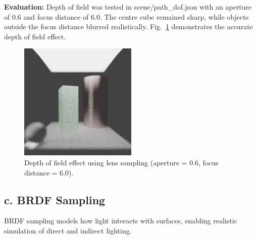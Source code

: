\documentclass[11pt,a4paper]{article}
\begin{document}
\noindent\textbf{Evaluation:}
Depth of field was tested in scene/path\_dof.json with an aperture of 0.6 and focus distance of 6.0. The centre cube remained sharp, while objects outside the focus distance blurred realistically. Fig.~\ref{fig:lens_sampling} demonstrates the accurate depth of field effect.

\begin{figure}[h!]
\centering
\includegraphics[width=0.5\textwidth]{dof.png}
\caption{Depth of field effect using lens sampling (aperture = 0.6, focus distance = 6.0).}
\label{fig:lens_sampling}
\end{figure}

\subsection{c. BRDF Sampling}  
\label{sec:brdf-sampling}

BRDF sampling models how light interacts with surfaces, enabling realistic simulation of direct and indirect lighting.
\end{document}
